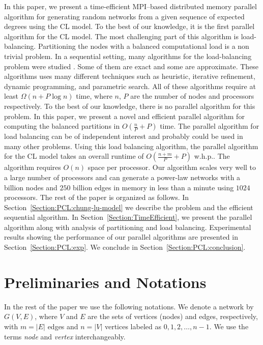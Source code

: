 \documentclass[conference,letterpaper,10pt]{IEEEtran}
\begin{document}
In this paper, we present a time-efficient  MPI--based distributed memory parallel algorithm for generating random networks from a given sequence of expected degrees using the CL model. To the best of our knowledge, it is the first parallel algorithm for the CL model. The most challenging part of this algorithm is load-balancing. Partitioning the nodes with a balanced computational load is a non trivial problem. In a sequential setting, many algorithms for the load-balancing problem were studied \cite{Manne1995,Olstad1995,Pinar2004}. 
Some of them are exact and some are approximate. 
These algorithms uses many different techniques such as heuristic, iterative refinement, dynamic programming, and parametric search. All of these algorithms require at least $\Omega(n+P\log{n})$ time, where $n$, $P$ are the number of nodes and processors respectively.  To the best of our knowledge, there is no parallel algorithm for this problem. In this paper, we present a novel and efficient parallel algorithm for computing the balanced partitions in $O(\frac{n}{P}+P)$ time. The parallel algorithm for load balancing can be of independent interest and probably could be used in many other problems. Using this load balancing algorithm, the parallel algorithm for the CL model takes an overall runtime of $O(\frac{n+m}{P}+P)$ {w.h.p.}. The algorithm requires $O(n)$ space per processor. Our algorithm scales very well to a large number of processors and can generate a power-law networks with a billion nodes and $250$ billion edges in memory in less than a minute using $1024$ processors.
The rest of the paper is organized as follows. 
In Section~\ref{Section:PCL:chung-lu-model} we describe the problem and the efficient sequential algorithm. 
In Section~\ref{Section:TimeEfficient}, we present the parallel algorithm along with analysis of partitioning and load balancing. 
Experimental results showing the performance of our parallel algorithms are presented in Section~\ref{Section:PCL:exp}. We conclude in Section~\ref{Section:PCL:conclusion}.

\section{Preliminaries and Notations} \label{Section:PCL:prelim}
In the rest of the paper we use the following notations. We denote a network by $G(V,E)$, where $V$ and $E$ are the sets of vertices (nodes) and edges, respectively, with $m = |E|$ edges and $n = |V|$ vertices labeled as $0, 1, 2, \dots, n-1$. We use the terms \emph{node} and \emph{vertex} interchangeably. 
\end{document}
